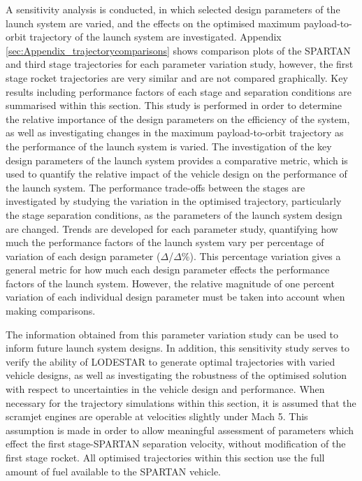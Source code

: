 A sensitivity analysis is conducted, in which selected design parameters of the launch system are varied, and the effects on the optimised maximum payload-to-orbit trajectory of the launch system are investigated. Appendix \ref{sec:Appendix_trajectorycomparisons} shows comparison plots of the SPARTAN and third stage trajectories for each parameter variation study, however, the first stage rocket trajectories are very similar and are not compared graphically. Key results including performance factors of each stage and separation conditions are summarised within this section.
This study is performed in order to determine the relative importance of the design parameters on the efficiency of the system, as well as investigating changes in the maximum payload-to-orbit trajectory as the performance of the launch system is varied. The investigation of the key design parameters of the launch system provides a comparative metric, which is used to quantify the relative impact of the vehicle design on the performance of the launch system. The performance trade-offs between the stages are investigated by studying the variation in the optimised trajectory, particularly the stage separation conditions, as the parameters of the launch system design are changed. 
Trends are developed for each parameter study, quantifying how much the performance factors of the launch system vary per percentage of variation of each design parameter ($\Delta$/$\Delta$\%). This percentage variation gives a general metric for how much each design parameter effects the performance factors of the launch system. However, the relative magnitude of one percent variation of each individual design parameter must be taken into account when making comparisons. 

The information obtained from this parameter variation study can be used to inform future launch system designs. 
In addition, this sensitivity study serves to verify the ability of LODESTAR to generate optimal trajectories with varied vehicle designs, as well as investigating the robustness of the optimised solution with respect to uncertainties in the vehicle design and performance.
When necessary for the trajectory simulations within this section, it is assumed that the scramjet engines are operable at velocities slightly under Mach 5. This assumption is made in order to allow meaningful assessment of parameters which effect the first stage-SPARTAN separation velocity, without modification of the first stage rocket.
All optimised trajectories within this section use the full amount of fuel available to the SPARTAN vehicle. 

